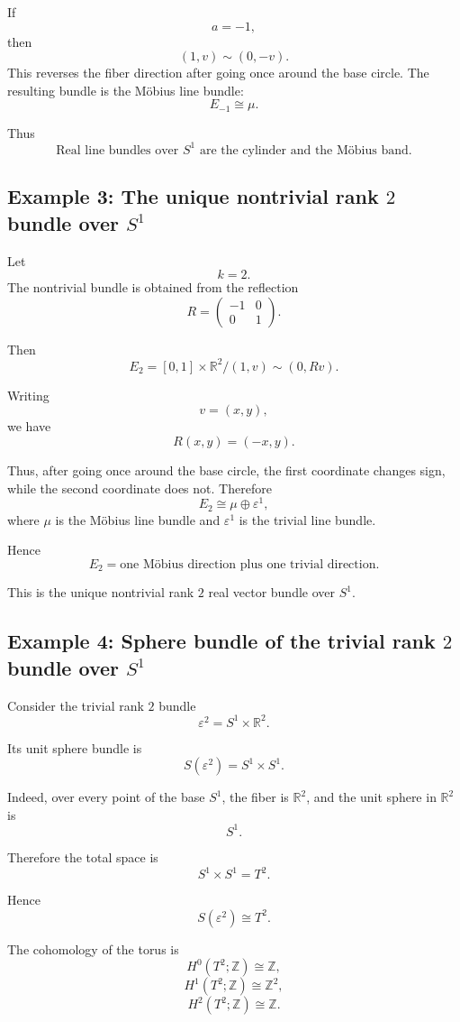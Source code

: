 \documentclass[12pt,a4paper]{article}
\theoremstyle{notespace}
\begin{document}
If
\[
a=-1,
\]
then
\[
(1,v)\sim(0,-v).
\]
This reverses the fiber direction after going once around the base circle. The resulting bundle is the M\"obius line bundle:
\[
E_{-1}\cong \mu.
\]

Thus
\[
\boxed{
	\text{Real line bundles over }S^1
	\text{ are the cylinder and the M\"obius band.}
}
\]

\subsection{Example 3: The unique nontrivial rank \(2\) bundle over \(S^1\)}

Let
\[
k=2.
\]
The nontrivial bundle is obtained from the reflection
\[
R=
\begin{pmatrix}
	-1&0\\
	0&1
\end{pmatrix}.
\]

Then
\[
E_2=[0,1]\times \mathbb{R}^2/(1,v)\sim(0,Rv).
\]

Writing
\[
v=(x,y),
\]
we have
\[
R(x,y)=(-x,y).
\]

Thus, after going once around the base circle, the first coordinate changes sign, while the second coordinate does not. Therefore
\[
E_2\cong \mu\oplus \varepsilon^1,
\]
where \(\mu\) is the M\"obius line bundle and \(\varepsilon^1\) is the trivial line bundle.

Hence
\[
\boxed{
	E_2=\text{one M\"obius direction plus one trivial direction.}
}
\]

This is the unique nontrivial rank \(2\) real vector bundle over \(S^1\).

\subsection{Example 4: Sphere bundle of the trivial rank \(2\) bundle over \(S^1\)}

Consider the trivial rank \(2\) bundle
\[
\varepsilon^2=S^1\times \mathbb{R}^2.
\]

Its unit sphere bundle is
\[
S(\varepsilon^2)=S^1\times S^1.
\]

Indeed, over every point of the base \(S^1\), the fiber is \(\mathbb{R}^2\), and the unit sphere in \(\mathbb{R}^2\) is
\[
S^1.
\]

Therefore the total space is
\[
S^1\times S^1=T^2.
\]

Hence
\[
\boxed{
	S(\varepsilon^2)\cong T^2.
}
\]

The cohomology of the torus is
\[
H^0(T^2;\mathbb{Z})\cong \mathbb{Z},
\]
\[
H^1(T^2;\mathbb{Z})\cong \mathbb{Z}^2,
\]
\[
H^2(T^2;\mathbb{Z})\cong \mathbb{Z}.
\]
\end{document}
